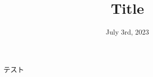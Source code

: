 \documentclass{kut_exp_4ci}
\title{Title}
\date{July 3rd, 2023}
\begin{document}
% 
% 

テスト
\end{document}
